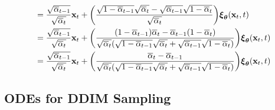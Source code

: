 \documentclass[10pt]{article}
\newcommand{\ve}[1]{\mathbf{#1}}
\newcommand{\ves}[1]{\boldsymbol{#1}}
\newcommand{\ov}[1]{\overline{#1}}
\begin{document}
\begin{itemize}
\begin{align}
    &= \frac{\sqrt{\ov{\alpha}_{t-1}}}{\sqrt{\ov{\alpha}_t}} \ve{x}_t 
    + \bigg(  \frac{\sqrt{1 - \ov{\alpha}_{t-1}}\sqrt{\ov{\alpha}_t} - \sqrt{\ov{\alpha}_{t-1}} \sqrt{1 - \ov{\alpha}_t} }{\sqrt{\ov{\alpha}_t}}  \bigg) \ves{\xi}_{\ves{\theta}}(\ve{x}_t, t) \notag\\
    &= \frac{\sqrt{\ov{\alpha}_{t-1}}}{\sqrt{\ov{\alpha}_t}} \ve{x}_t 
    + \bigg(  \frac{ (1 - \ov{\alpha}_{t-1})\ov{\alpha}_t - \ov{\alpha}_{t-1} (1 - \ov{\alpha}_t) }{\sqrt{\ov{\alpha}_t}(\sqrt{1 - \ov{\alpha}_{t-1}}\sqrt{\ov{\alpha}_t} + \sqrt{\ov{\alpha}_{t-1}} \sqrt{1 - \ov{\alpha}_t} )}   \bigg) \ves{\xi}_{\ves{\theta}}(\ve{x}_t, t) \notag \\
    &= \frac{\sqrt{\ov{\alpha}_{t-1}}}{\sqrt{\ov{\alpha}_t}} \ve{x}_t 
    + \bigg(  \frac{ \ov{\alpha}_t - \ov{\alpha}_{t-1} }{\sqrt{\ov{\alpha}_t}(\sqrt{1 - \ov{\alpha}_{t-1}}\sqrt{\ov{\alpha}_t} + \sqrt{\ov{\alpha}_{t-1}} \sqrt{1 - \ov{\alpha}_t} )}   \bigg) \ves{\xi}_{\ves{\theta}}(\ve{x}_t, t) \label{eqn:ddim-update-equation-noise}
  \end{align}
\end{itemize}

\subsection{ODEs for DDIM Sampling}
\end{document}
